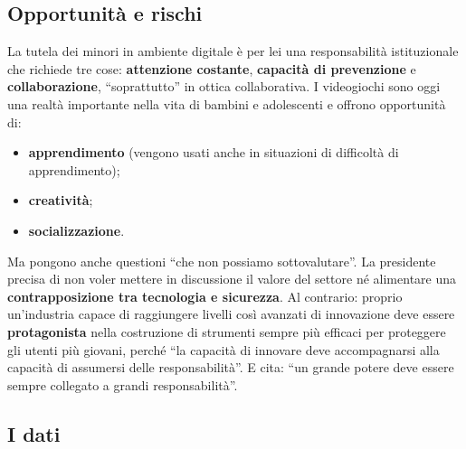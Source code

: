 \subsection{Opportunità e rischi}

La tutela dei minori in ambiente digitale è per lei una responsabilità
istituzionale che richiede tre cose: \textbf{attenzione costante},
\textbf{capacità di prevenzione} e \textbf{collaborazione}, ``soprattutto''
in ottica collaborativa. I videogiochi sono oggi una realtà importante nella
vita di bambini e adolescenti e offrono opportunità di:
\begin{itemize}
  \item \textbf{apprendimento} (vengono usati anche in situazioni di
        difficoltà di apprendimento);
  \item \textbf{creatività};
  \item \textbf{socializzazione}.
\end{itemize}
Ma pongono anche questioni ``che non possiamo sottovalutare''. La presidente
precisa di non voler mettere in discussione il valore del settore né alimentare
una \textbf{contrapposizione tra tecnologia e sicurezza}. Al contrario: proprio
un'industria capace di raggiungere livelli così avanzati di innovazione deve
essere \textbf{protagonista} nella costruzione di strumenti sempre più efficaci
per proteggere gli utenti più giovani, perché ``la capacità di innovare deve
accompagnarsi alla capacità di assumersi delle responsabilità''. E cita: ``un
grande potere deve essere sempre collegato a grandi responsabilità''.

\subsection{I dati}

